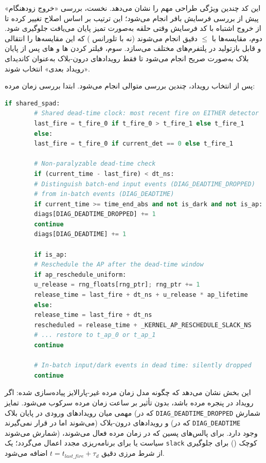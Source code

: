 این کد چندین ویژگی طراحی مهم را نشان می‌دهد. نخست، بررسی «خروج زودهنگام»  پیش از بررسی فرسایش بافر انجام می‌شود؛ این ترتیب بر اساس اصلاح  تغییر کرده تا از خروج اشتباه با کد فرسایش وقتی حلقه به‌صورت تمیز پایان می‌یافت جلوگیری شود. دوم، مقایسه‌ها با $\leq$ دقیق انجام می‌شوند (نه با تلورانس ) که این مقایسه‌ها را انتقالی  و قابل بازتولید در پلتفرم‌های مختلف می‌سازد. سوم، فیلتر کردن ها و های پس از پایان بلاک به‌صورت صریح انجام می‌شود تا فقط رویدادهای درون-بلاک به‌عنوان کاندیدای «رویداد بعدی» انتخاب شوند.

پس از انتخاب رویداد، چندین بررسی متوالی انجام می‌شود. ابتدا بررسی زمان مرده:

\begin{LTR}
	\begin{lstlisting}[language=Python]
		if shared_spad:
		# Shared dead-time clock: most recent fire on EITHER detector
		last_fire = t_fire_0 if t_fire_0 > t_fire_1 else t_fire_1
		else:
		last_fire = t_fire_0 if current_det == 0 else t_fire_1
		
		# Non-paralyzable dead-time check
		if (current_time - last_fire) < dt_ns:
		# Distinguish batch-end input events (DIAG_DEADTIME_DROPPED)
		# from in-batch events (DIAG_DEADTIME)
		if current_time >= time_end_abs and not is_dark and not is_ap:
		diags[DIAG_DEADTIME_DROPPED] += 1
		continue
		diags[DIAG_DEADTIME] += 1
		
		if is_ap:
		# Reschedule the AP after the dead-time window
		if ap_reschedule_uniform:
		u_release = rng_floats[rng_ptr]; rng_ptr += 1
		release_time = last_fire + dt_ns + u_release * ap_lifetime
		else:
		release_time = last_fire + dt_ns
		rescheduled = release_time + _KERNEL_AP_RESCHEDULE_SLACK_NS
		# ... restore to t_ap_0 or t_ap_1
		continue
		
		# In-batch input/dark events in dead time: silently dropped
		continue
	\end{lstlisting}
\end{LTR}

این بخش نشان می‌دهد که چگونه مدل زمان مرده غیر-پارالایز پیاده‌سازی شده: اگر رویداد در پنجره مرده باشد، بدون تأثیر بر ساعت زمان مرده سرکوب می‌شود. تمایز مهمی میان رویدادهای ورودی در پایان بلاک (که در \texttt{DIAG\_DEADTIME\_DROPPED} شمارش می‌شوند اما در  قرار نمی‌گیرند) و رویدادهای درون-بلاک (که در \texttt{DIAG\_DEADTIME} شمارش می‌شوند) وجود دارد. برای پالس‌های پسین که در زمان مرده فعال می‌شوند، سیاست  یا  برای برنامه‌ریزی مجدد اعمال می‌گردد؛ یک \texttt{slack} کوچک () برای جلوگیری از شرط مرزی دقیق $t = t_{last\_fire} + \tau_d$ اضافه می‌شود.

